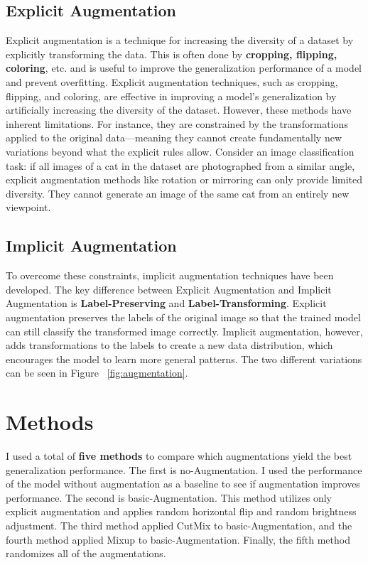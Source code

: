 \documentclass{article}
\begin{document}
\subsection{Explicit Augmentation}


Explicit augmentation is a technique for increasing the diversity of a dataset by explicitly transforming the data. This is often done by {\bf cropping, flipping, coloring}, etc. and is useful to improve the generalization performance of a model and prevent overfitting\cite{krizhevsky2012}. Explicit augmentation techniques, such as cropping, flipping, and coloring, are effective in improving a model’s generalization by artificially increasing the diversity of the dataset. However, these methods have inherent limitations. For instance, they are constrained by the transformations applied to the original data—meaning they cannot create fundamentally new variations beyond what the explicit rules allow. Consider an image classification task: if all images of a cat in the dataset are photographed from a similar angle, explicit augmentation methods like rotation or mirroring can only provide limited diversity. They cannot generate an image of the same cat from an entirely new viewpoint.


\subsection{Implicit Augmentation}

To overcome these constraints, implicit augmentation techniques have been developed. The key difference between Explicit Augmentation and Implicit Augmentation is {\bf Label-Preserving} and {\bf Label-Transforming}. Explicit augmentation preserves the labels of the original image so that the trained model can still classify the transformed image correctly. Implicit augmentation, however, adds transformations to the labels to create a new data distribution, which encourages the model to learn more general patterns. The two different variations can be seen in Figure ~\ref{fig:augmentation}.


\section{Methods}
\label{gen_inst}


I used a total of {\bf five methods} to compare which augmentations yield the best generalization performance. The first is no-Augmentation. I used the performance of the model without augmentation as a baseline to see if augmentation improves performance. The second is basic-Augmentation. This method utilizes only explicit augmentation and applies random horizontal flip and random brightness adjustment. The third method applied CutMix to basic-Augmentation, and the fourth method applied Mixup to basic-Augmentation. Finally, the fifth method randomizes all of the augmentations.
\end{document}
